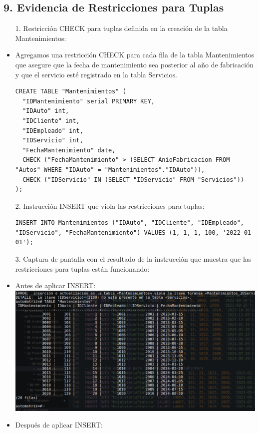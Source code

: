 \documentclass[12pt]{article}
\begin{document}
    \subsection*{9. Evidencia de Restricciones para Tuplas}
    \begin{itemize}
        \item[1.] Restricción CHECK para tuplas definida en la creación de la tabla Mantenimientos:
        \item Agregamos una restricción CHECK para cada fila de la tabla Mantenimientos que asegure que la fecha de mantenimiento sea posterior al año de fabricación y que el servicio esté registrado en la tabla Servicios.
        \begin{lstlisting}
CREATE TABLE "Mantenimientos" (
  "IDMantenimiento" serial PRIMARY KEY,
  "IDAuto" int,
  "IDCliente" int,
  "IDEmpleado" int,
  "IDServicio" int,
  "FechaMantenimiento" date,
  CHECK ("FechaMantenimiento" > (SELECT AnioFabricacion FROM "Autos" WHERE "IDAuto" = "Mantenimientos"."IDAuto")),
  CHECK ("IDServicio" IN (SELECT "IDServicio" FROM "Servicios"))
);            
        \end{lstlisting}
        \item[2.] Instrucción INSERT que viola las restricciones para tuplas:
        \begin{lstlisting}
INSERT INTO Mantenimientos ("IDAuto", "IDCliente", "IDEmpleado", "IDServicio", "FechaMantenimiento") VALUES (1, 1, 1, 100, '2022-01-01');
        \end{lstlisting}
        \item[3.] Captura de pantalla con el resultado de la instrucción que muestra que las restricciones para tuplas están funcionando:
        \item Antes de aplicar INSERT:
        \center\includegraphics[width=1.0\textwidth]{H.png}
        \item Después de aplicar INSERT:

\end{itemize}
\end{document}
